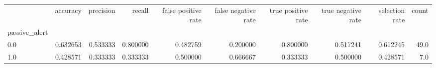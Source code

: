 \begin{tabular}{lrrrrrrrrr}
\toprule
{} &  accuracy &  precision &    recall &  false positive rate &  false negative rate &  true positive rate &  true negative rate &  selection rate &  count \\
passive\_alert &           &            &           &                      &                      &                     &                     &                 &        \\
\midrule
0.0           &  0.632653 &   0.533333 &  0.800000 &             0.482759 &             0.200000 &            0.800000 &            0.517241 &        0.612245 &   49.0 \\
1.0           &  0.428571 &   0.333333 &  0.333333 &             0.500000 &             0.666667 &            0.333333 &            0.500000 &        0.428571 &    7.0 \\
\bottomrule
\end{tabular}
